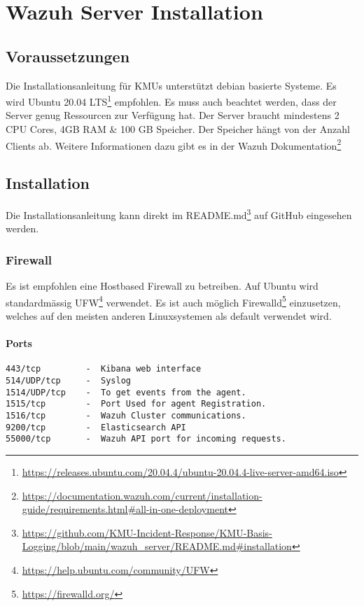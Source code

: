\chapter{Wazuh Server Installation}

\section{Voraussetzungen}
Die Installationsanleitung für KMUs unterstützt debian basierte Systeme.
Es wird Ubuntu 20.04 LTS\footnote{\href{https://releases.ubuntu.com/20.04.4/ubuntu-20.04.4-live-server-amd64.iso}{https://releases.ubuntu.com/20.04.4/ubuntu-20.04.4-live-server-amd64.iso}} empfohlen.
Es muss auch beachtet werden, dass der Server genug Ressourcen zur Verfügung hat.
Der Server braucht mindestens 2 CPU Cores, 4GB RAM \& 100 GB Speicher.
Der Speicher hängt von der Anzahl Clients ab.
Weitere Informationen dazu gibt es in der Wazuh Dokumentation\footnote{\href{https://documentation.wazuh.com/current/installation-guide/requirements.html\#all-in-one-deployment}{https://documentation.wazuh.com/current/installation-guide/requirements.html\#all-in-one-deployment}} 

\section{Installation}
Die Installationsanleitung kann direkt im README.md\footnote{\href{https://github.com/KMU-Incident-Response/KMU-Basis-Logging/blob/main/wazuh\_server/README.md\#installation}{https://github.com/KMU-Incident-Response/KMU-Basis-Logging/blob/main/wazuh\_server/README.md\#installation}} auf GitHub eingesehen werden.


\subsection{Firewall}
Es ist empfohlen eine Hostbased Firewall zu betreiben.
Auf Ubuntu wird standardmässig UFW\footnote{\href{https://help.ubuntu.com/community/UFW}{https://help.ubuntu.com/community/UFW}} verwendet.
Es ist auch möglich Firewalld\footnote{\href{https://firewalld.org/}{https://firewalld.org/}} einzusetzen, welches auf den meisten anderen Linuxsystemen als default verwendet wird.

\subsubsection{Ports}
\begin{lstlisting}
443/tcp         -  Kibana web interface
514/UDP/tcp     -  Syslog
1514/UDP/tcp    -  To get events from the agent.
1515/tcp        -  Port Used for agent Registration.
1516/tcp        -  Wazuh Cluster communications.
9200/tcp        -  Elasticsearch API
55000/tcp       -  Wazuh API port for incoming requests.
\end{lstlisting}




